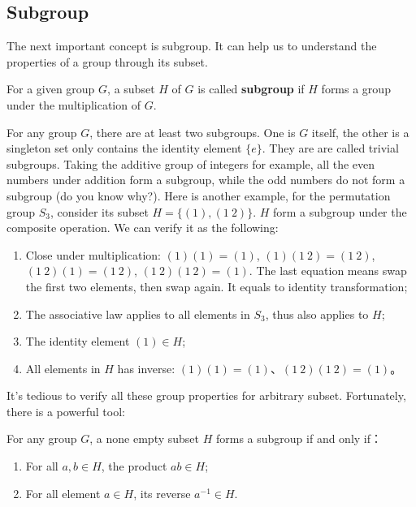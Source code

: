\documentclass{article}
\begin{document}
\begin{Exercise}
\end{Exercise}

\subsection{Subgroup}

The next important concept is subgroup. It can help us to understand the properties of a group through its subset.

\begin{definition}
For a given group $G$, a subset $H$ of $G$ is called \textbf{subgroup} if $H$ forms a group under the multiplication of $G$.
\end{definition}

For any group $G$, there are at least two subgroups. One is $G$ itself, the other is a singleton set only contains the identity element $\{e\}$. They are are called trivial subgroups. Taking the additive group of integers for example, all the even numbers under addition form a subgroup, while the odd numbers do not form a subgroup (do you know why?). Here is another example, for the permutation group $S_3$, consider its subset $H = \{(1), (1\ 2)\}$. $H$ form a subgroup under the composite operation. We can verify it as the following:

\begin{enumerate}
\item Close under multiplication: $(1)(1) = (1)$, $(1)(1\ 2) = (1\ 2)$, $(1\ 2)(1) = (1\ 2)$, $(1\ 2) (1\ 2) = (1)$. The last equation means swap the first two elements, then swap again. It equals to identity transformation;
\item The associative law applies to all elements in $S_3$, thus also applies to $H$;
\item The identity element $(1) \in H$;
\item All elements in $H$ has inverse: $(1)(1) = (1)$、$(1\ 2) (1\ 2) = (1)$。
\end{enumerate}

It's tedious to verify all these group properties for arbitrary subset. Fortunately, there is a powerful tool:

\begin{theorem}
For any group $G$, a none empty subset $H$ forms a subgroup if and only if：
\begin{enumerate}
\item For all $a, b \in H$, the product $ab \in H$;
\item For all element $a \in H$, its reverse $a^{-1} \in H$.
\end{enumerate}
\label{theorem:subgroup}
\end{theorem}
\end{document}
